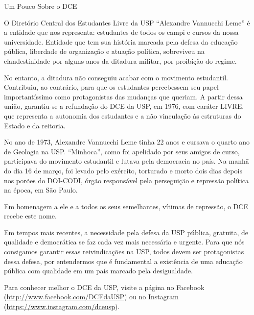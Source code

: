 \begin{secao}{Um Pouco Sobre o DCE}

O Diretório Central dos Estudantes Livre da USP ``Alexandre Vannucchi Leme'' é a
entidade que nos representa: estudantes de todos os campi e cursos da nossa universidade.
Entidade que tem sua história marcada pela defesa da educação pública, liberdade
de organização e atuação política, sobreviveu na clandestinidade por alguns anos
da ditadura militar, por proibição do regime.

No entanto, a ditadura não conseguiu acabar com o movimento estudantil. Contribuiu,
ao contrário, para que os estudantes percebessem seu papel importantíssimo como
protagonistas das mudanças que queriam. A partir dessa união, garantiu-se a
refundação do DCE da USP, em 1976, com caráter LIVRE, que representa a autonomia
dos estudantes e a não vinculação às estruturas do Estado e da reitoria.

No ano de 1973, Alexandre Vannucchi Leme tinha 22 anos e cursava o quarto ano
de Geologia na USP. ``Minhoca'', como foi apelidado por seus amigos de curso, participava
do movimento estudantil e lutava pela democracia no país. Na manhã do dia 16 de março,
foi levado pelo exército, torturado e morto dois dias depois nos porões do DOI-CODI,
órgão responsável pela perseguição e repressão política na época, em São Paulo.

Em homenagem a ele e a todos os seus semelhantes, vítimas de repressão, o DCE recebe este nome.

Em tempos mais recentes, a necessidade pela defesa da USP pública, gratuita, de qualidade
e democrática se faz cada vez mais necessária e urgente. Para que nós consigamos
garantir essas reivindicações na USP, todos devem ser protagonistas dessa defesa,
por entendermos que é fundamental a existência de uma educação pública com qualidade
em um país marcado pela desigualdade.

Para conhecer melhor o DCE da USP, visite a página no Facebook
(\url{http://www.facebook.com/DCEdaUSP}) ou no Instagram (\url{https://www.instagram.com/dceusp}).

\end{secao}

